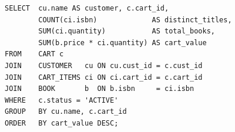 \begin{lstlisting}[caption={Q8: Active cart summary with totals}]
SELECT  cu.name AS customer, c.cart_id,
        COUNT(ci.isbn)             AS distinct_titles,
        SUM(ci.quantity)           AS total_books,
        SUM(b.price * ci.quantity) AS cart_value
FROM    CART c
JOIN    CUSTOMER   cu ON cu.cust_id = c.cust_id
JOIN    CART_ITEMS ci ON ci.cart_id = c.cart_id
JOIN    BOOK       b  ON b.isbn     = ci.isbn
WHERE   c.status = 'ACTIVE'
GROUP   BY cu.name, c.cart_id
ORDER   BY cart_value DESC;
\end{lstlisting}